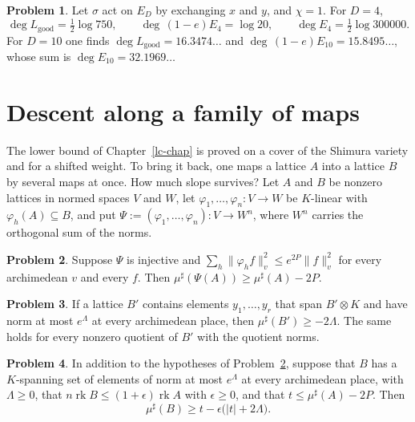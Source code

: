\documentclass[reqno]{amsart}
\newcounter{chap}
\theoremstyle{definition}
\newtheorem{problem}{Problem}[section]
\theoremstyle{plain}
\theoremstyle{remark}
\newcommand{\rk}{\operatorname{rk}}
\newcommand{\mus}{\mu^\sharp}
\newcommand{\Lg}{L_{\mathrm{good}}}
\begin{document}
\begin{problem}\label{pr:swap-ED}
Let \(\sigma\) act on \(E_D\) by exchanging \(x\) and \(y\), and \(\chi = 1\).  For \(D = 4\),
\[
  \deg\Lg = \tfrac12\log750 , \qquad \deg\,(1-e)E_4 = \log 20 , \qquad \deg E_4 = \tfrac12\log300000 .
\]
For \(D = 10\) one finds \(\deg\Lg = 16.3474\ldots\) and \(\deg\,(1-e)E_{10} = 15.8495\ldots\), whose sum is \(\deg E_{10} = 32.1969\ldots\)
\end{problem}

\section{Descent along a family of maps}\label{sec:descent}

The lower bound of Chapter~\ref{lc-chap} is proved on a cover of the Shimura variety and for a shifted weight.  To bring it back, one maps a lattice \(A\) into a lattice \(B\) by several maps at once.  How much slope survives?  Let \(A\) and \(B\) be nonzero lattices in normed spaces \(V\) and \(W\), let \(\varphi_1, \dots, \varphi_n \colon V \to W\) be \(K\)-linear with \(\varphi_h(A) \subseteq B\), and put \(\Psi := (\varphi_1, \dots, \varphi_n) \colon V \to W^n\), where \(W^n\) carries the orthogonal sum of the norms.

\begin{problem}\label{pr:joint}
Suppose \(\Psi\) is injective and \(\sum_h\lVert\varphi_hf\rVert_v^2 \le e^{2P}\lVert f\rVert_v^2\) for every archimedean \(v\) and every \(f\).  Then \(\mus(\Psi(A)) \ge \mus(A) - 2P\).
\end{problem}

\begin{problem}\label{pr:generated}
If a lattice \(B'\) contains elements \(y_1, \dots, y_r\) that span \(B' \otimes K\) and have norm at most \(e^\Lambda\) at every archimedean place, then \(\mus(B') \ge -2\Lambda\).  The same holds for every nonzero quotient of \(B'\) with the quotient norms.
\end{problem}

\begin{problem}\label{pr:descent}
In addition to the hypotheses of Problem~\ref{pr:joint}, suppose that \(B\) has a \(K\)-spanning set of elements of norm at most \(e^\Lambda\) at every archimedean place, with \(\Lambda \ge 0\), that \(n\rk B \le (1+\epsilon)\rk A\) with \(\epsilon \ge 0\), and that \(t \le \mus(A) - 2P\).  Then
\[
  \mus(B) \ge t - \epsilon\bigl(\lvert t\rvert + 2\Lambda\bigr) .
\]
\end{problem}
\end{document}
